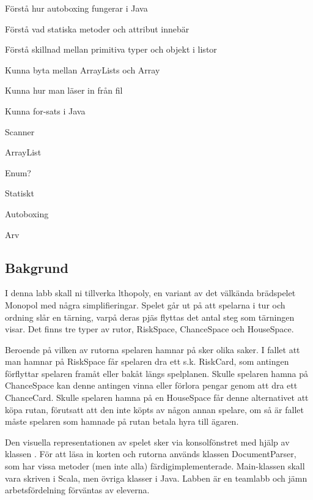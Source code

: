 

\Lab{\LabWeekELEVEN}

\begin{Goals}
\item Förstå hur autoboxing fungerar i Java
\item Förstå vad statiska metoder och attribut innebär
\item Förstå skillnad mellan primitiva typer och objekt i listor
\item Kunna byta mellan ArrayLists och Array
\item Kunna hur man läser in från fil
\item Kunna for-sats i Java


\end{Goals}

\begin{Preparations}
\item Scanner
\item ArrayList
\item Enum?
\item Statiskt
\item Autoboxing
\item Arv
\end{Preparations}

\subsection{Bakgrund}
I denna labb skall ni tillverka lthopoly, en variant av det välkända brädspelet Monopol med några simplifieringar. Spelet går ut på att spelarna i tur och ordning slår en tärning, varpå deras pjäs flyttas det antal steg som tärningen visar. Det finns tre typer av rutor, RiskSpace, ChanceSpace och HouseSpace. 

Beroende på vilken av rutorna spelaren hamnar på sker olika saker. I fallet att man hamnar på RiskSpace får spelaren dra ett s.k. RiskCard, som antingen förflyttar spelaren framåt eller bakåt längs spelplanen. 
Skulle spelaren hamna på ChanceSpace kan denne antingen vinna eller förlora pengar genom att dra ett ChanceCard. Skulle spelaren hamna på en HouseSpace får denne alternativet att köpa rutan, förutsatt att den inte köpts av någon annan spelare, om så är fallet måste spelaren som hamnade på rutan betala hyra till ägaren.

Den visuella representationen av spelet sker via konsolfönstret med hjälp av klassen . 
För att läsa in korten och rutorna används klassen DocumentParser, som har vissa metoder (men inte alla) färdigimplementerade.
Main-klassen skall vara skriven i Scala, men övriga klasser i Java. 
Labben är en teamlabb och jämn arbetsfördelning förväntas av eleverna.

